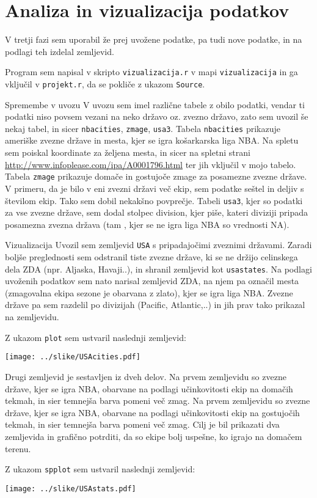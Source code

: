 \documentclass[11pt,a4paper]{article}
\begin{document}
\section{Analiza in vizualizacija podatkov}

V tretji fazi sem uporabil že prej uvožene podatke, pa tudi nove podatke, in na podlagi teh izdelal zemljevid.

Program sem napisal v skripto \verb|vizualizacija.r| v mapi \verb|vizualizacija| in ga vključil v \verb|projekt.r|, da se pokliče z ukazom \verb|Source|.

Spremembe v uvozu
V uvozu sem imel različne tabele z obilo podatki, vendar ti podatki niso povsem vezani na neko državo oz. zvezno državo, zato sem uvozil še nekaj tabel, in sicer \verb|nbacities|, \verb|zmage|,
\verb|usa3|. Tabela \verb|nbacities| prikazuje ameriške zvezne države in mesta, kjer se igra košarkarska liga NBA. Na spletu sem poiskal koordinate za željena mesta, in sicer na spletni strani \url{http://www.infoplease.com/ipa/A0001796.html} ter jih vključil v mojo tabelo. Tabela \verb|zmage| prikazuje domače in gostujoče zmage za posamezne zvezne države. V primeru, da je bilo v eni zvezni državi več ekip, sem podatke seštel in deljiv s številom ekip. Tako sem dobil nekakšno povprečje. Tabeli \verb|usa3|, kjer so podatki za vse zvezne države, sem dodal stolpec division, kjer piše, kateri diviziji pripada posamezna zvezna država (tam , kjer se ne igra liga NBA so vrednosti NA).

Vizualizacija
Uvozil sem zemljevid \verb|USA| s pripadajočimi zveznimi državami. Zaradi boljše preglednosti sem odstranil tiste zvezne države, ki se ne držijo celinskega dela ZDA (npr. Aljaska, Havaji..), in shranil zemljevid kot \verb|usastates|. Na podlagi uvoženih podatkov sem nato narisal zemljevid ZDA, na njem pa označil mesta (zmagovalna ekipa sezone je obarvana z zlato), kjer se igra liga NBA. Zvezne države pa sem razdelil po divizijah (Pacific, Atlantic,..) in jih prav tako prikazal na zemljevidu.

Z ukazom \verb|plot| sem ustvaril naslednji zemljevid:

\texttt{[image: ../slike/USAcities.pdf]}

Drugi zemljevid je sestavljen iz dveh delov. 
Na prvem zemljevidu so zvezne države, kjer se igra NBA, obarvane na podlagi učinkovitosti ekip na domačih tekmah, in sier temnejša barva pomeni več zmag.
Na prvem zemljevidu so zvezne države, kjer se igra NBA, obarvane na podlagi učinkovitosti ekip na gostujočih tekmah, in sier temnejša barva pomeni več zmag.
Cilj je bil prikazati dva zemljevida in grafično potrditi, da so ekipe bolj uspešne, ko igrajo na domačem terenu.

Z ukazom \verb|spplot| sem ustvaril naslednji zemljevid:

\texttt{[image: ../slike/USAstats.pdf]}

% 
\end{document}
